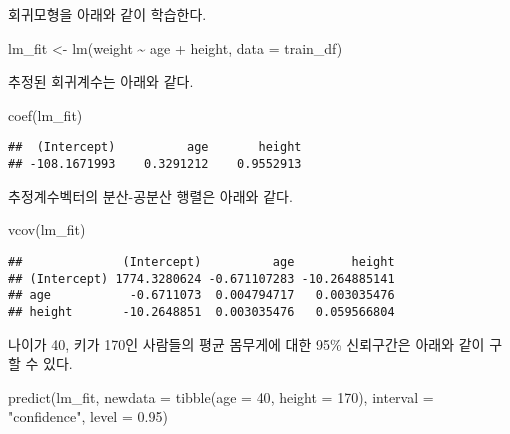 \documentclass[
]{book}
\newenvironment{Shaded}{\begin{snugshade}}{\end{snugshade}}
\newcommand{\AttributeTok}[1]{\textcolor[rgb]{0.77,0.63,0.00}{#1}}
\newcommand{\DecValTok}[1]{\textcolor[rgb]{0.00,0.00,0.81}{#1}}
\newcommand{\FloatTok}[1]{\textcolor[rgb]{0.00,0.00,0.81}{#1}}
\newcommand{\FunctionTok}[1]{\textcolor[rgb]{0.00,0.00,0.00}{#1}}
\newcommand{\NormalTok}[1]{#1}
\newcommand{\OtherTok}[1]{\textcolor[rgb]{0.56,0.35,0.01}{#1}}
\newcommand{\SpecialCharTok}[1]{\textcolor[rgb]{0.00,0.00,0.00}{#1}}
\newcommand{\StringTok}[1]{\textcolor[rgb]{0.31,0.60,0.02}{#1}}
\begin{document}
회귀모형을 아래와 같이 학습한다.

\begin{Shaded}
\begin{Highlighting}[]
\NormalTok{lm\_fit }\OtherTok{\textless{}{-}} \FunctionTok{lm}\NormalTok{(weight }\SpecialCharTok{\textasciitilde{}}\NormalTok{ age }\SpecialCharTok{+}\NormalTok{ height, }\AttributeTok{data =}\NormalTok{ train\_df)}
\end{Highlighting}
\end{Shaded}

추정된 회귀계수는 아래와 같다.

\begin{Shaded}
\begin{Highlighting}[]
\FunctionTok{coef}\NormalTok{(lm\_fit)}
\end{Highlighting}
\end{Shaded}

\begin{verbatim}
##  (Intercept)          age       height 
## -108.1671993    0.3291212    0.9552913
\end{verbatim}

추정계수벡터의 분산-공분산 행렬은 아래와 같다.

\begin{Shaded}
\begin{Highlighting}[]
\FunctionTok{vcov}\NormalTok{(lm\_fit)}
\end{Highlighting}
\end{Shaded}

\begin{verbatim}
##              (Intercept)          age        height
## (Intercept) 1774.3280624 -0.671107283 -10.264885141
## age           -0.6711073  0.004794717   0.003035476
## height       -10.2648851  0.003035476   0.059566804
\end{verbatim}

나이가 40, 키가 170인 사람들의 평균 몸무게에 대한 95\% 신뢰구간은 아래와 같이 구할 수 있다.

\begin{Shaded}
\begin{Highlighting}[]
\FunctionTok{predict}\NormalTok{(lm\_fit, }\AttributeTok{newdata =} \FunctionTok{tibble}\NormalTok{(}\AttributeTok{age =} \DecValTok{40}\NormalTok{, }\AttributeTok{height =} \DecValTok{170}\NormalTok{),}
        \AttributeTok{interval =} \StringTok{"confidence"}\NormalTok{, }\AttributeTok{level =} \FloatTok{0.95}\NormalTok{)}
\end{Highlighting}
\end{Shaded}
\end{document}

